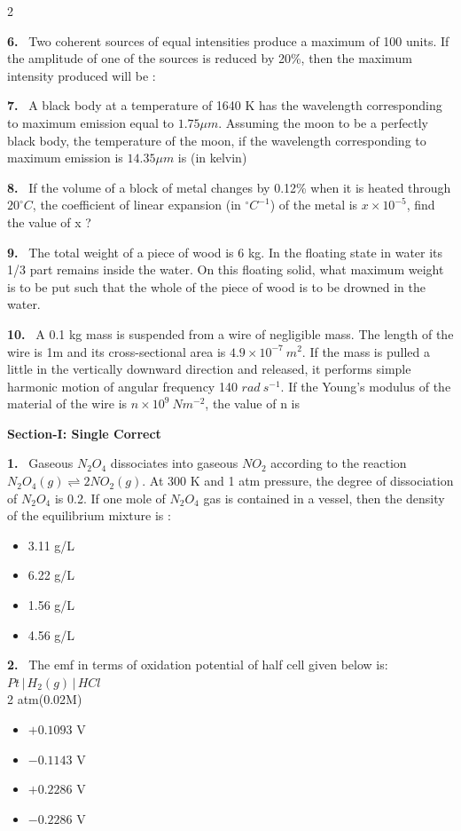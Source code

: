 \documentclass[10pt]{extarticle}
\newcommand{\partsec}[2]{\par\medskip\noindent{\large\bfseries PART-#1: #2}\par\smallskip}
\newcommand{\sect}[1]{\par\smallskip\noindent\textbf{#1}\par}
\newcommand{\qn}[1]{\par\smallskip\noindent\textbf{#1.}~}
\newenvironment{qoptions}{\begin{itemize}[leftmargin=1.8em,itemsep=1pt,topsep=2pt,label={}]}{\end{itemize}}
\newcommand{\opt}[2]{\item[(#1)] #2}
\begin{document}
\begin{multicols}{2}
\qn{6} Two coherent sources of equal intensities produce a maximum of 100 units. If the amplitude of one of the sources is reduced by 20\%, then the maximum intensity produced will be :

\qn{7} A black body at a temperature of 1640 K has the wavelength corresponding to maximum emission equal to $1.75\mu m$. Assuming the moon to be a perfectly black body, the temperature of the moon, if the wavelength corresponding to maximum emission is $14.35\mu m$ is (in kelvin)

\qn{8} If the volume of a block of metal changes by 0.12\% when it is heated through $20^\circ C$, the coefficient of linear expansion (in $^\circ C^{-1}$) of the metal is $x\times10^{-5}$, find the value of x ?

\qn{9} The total weight of a piece of wood is 6 kg. In the floating state in water its 1/3 part remains inside the water. On this floating solid, what maximum weight is to be put such that the whole of the piece of wood is to be drowned in the water.

\qn{10} A 0.1 kg mass is suspended from a wire of negligible mass. The length of the wire is 1m and its cross-sectional area is $4.9\times10^{-7}\ m^2$. If the mass is pulled a little in the vertically downward direction and released, it performs simple harmonic motion of angular frequency 140 $rad\ s^{-1}$. If the Young's modulus of the material of the wire is $n\times10^9\ Nm^{-2}$, the value of n is

\partsec{2}{CHEMISTRY}

\sect{Section-I: Single Correct}

\qn{1} Gaseous $N_2O_4$ dissociates into gaseous $NO_2$ according to the reaction $N_2O_4(g)\rightleftharpoons2NO_2(g)$. At 300 K and 1 atm pressure, the degree of dissociation of $N_2O_4$ is 0.2. If one mole of $N_2O_4$ gas is contained in a vessel, then the density of the equilibrium mixture is :
\begin{qoptions}
\opt{A}{3.11 g/L}
\opt{B}{6.22 g/L}
\opt{C}{1.56 g/L}
\opt{D}{4.56 g/L}
\end{qoptions}

\qn{2} The emf in terms of oxidation potential of half cell given below is:\\
$Pt\,|\,H_2(g)\,|\,HCl$\\
\hspace*{1.2em}2 atm\hspace{2em}(0.02M)
\begin{qoptions}
\opt{A}{$+0.1093$ V}
\opt{B}{$-0.1143$ V}
\opt{C}{$+0.2286$ V}
\opt{D}{$-0.2286$ V}
\end{qoptions}


\end{multicols}
\end{document}
